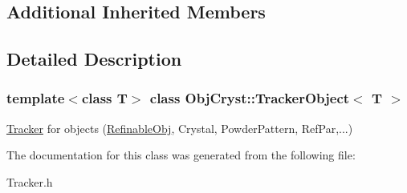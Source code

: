 \subsection*{Additional Inherited Members}


\subsection{Detailed Description}
\subsubsection*{template$<$class T$>$\newline
class Obj\+Cryst\+::\+Tracker\+Object$<$ T $>$}

\mbox{\hyperlink{class_obj_cryst_1_1_tracker}{Tracker}} for objects (\mbox{\hyperlink{class_obj_cryst_1_1_refinable_obj}{Refinable\+Obj}}, Crystal, Powder\+Pattern, Ref\+Par,...) 

The documentation for this class was generated from the following file\+:\begin{DoxyCompactItemize}
\item 
Tracker.\+h\end{DoxyCompactItemize}

